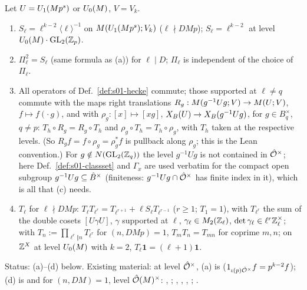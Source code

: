 \begin{proposition}[relations]\label{prop:s01-relations}
Let $U=U_1(Mp^s)$ or $U_0(M)$, $V=V_k$.
\begin{enumerate}[label=(\alph*)]
\item $S_\ell=\ell^{k-2}\langle\ell\rangle^{-1}$ on $M(U_1(Mp^s);V_k)$ ($\ell\nmid DMp$); $S_\ell=\ell^{k-2}$ at level
  $U_0(M)\cdot\mathrm{GL}_2(\mathbb{Z}_p)$.
\item $\Pi_\ell^2=S_\ell$ (same formula as (a)) for $\ell\mid D$; $\Pi_\ell$ is independent of the choice of $\Pi_\ell$.
\item All operators of Def.~\ref{def:s01-hecke} commute; those supported at $\ell\ne q$ commute with the maps
  right translations $R_g:M(g^{-1}Ug;V)\to M(U;V)$, $f\mapsto f(\cdot\,g)$, and with $\rho_g:[x]\mapsto[xg]$,
  $X_B(U)\to X_B(g^{-1}Ug)$, for $g\in B_q^\times$, $q\ne p$: $T_h\circ R_g=R_g\circ T_h$ and $\rho_g\circ T_h=T_h\circ\rho_g$, with $T_h$
  taken at the respective levels. (So $R_gf=f\circ\rho_g=\rho_g^*f$ is pullback along $\rho_g$; this is the Lean convention.) For $g\notin N(\mathrm{GL}_2(\mathbb{Z}_q))$ the level
  $g^{-1}Ug$ is not contained in $\hat{\mathcal{O}}^\times$; here Def.~\ref{def:s01-classset} and $\Gamma_x$ are used verbatim for the compact open subgroup $g^{-1}Ug\subseteq\hat{B}^\times$
  (finiteness: $g^{-1}Ug\cap\hat{\mathcal{O}}^\times$ has finite index in it), which is all that (c) needs.
\item $T_\ell$ for $\ell\nmid DMp$: $T_\ell T_{\ell^r}=T_{\ell^{r+1}}+\ell S_\ell T_{\ell^{r-1}}$ ($r\ge1$; $T_1=1$), with $T_{\ell^r}$ the sum of
  the double cosets $[U\gamma U]$, $\gamma$ supported at $\ell$, $\gamma_\ell\in M_2(\mathbb{Z}_\ell)$, $\det\gamma_\ell\in\ell^r\mathbb{Z}_\ell^\times$; with
  $T_n:=\prod_{\ell^r\Vert n}T_{\ell^r}$ for $(n,DMp)=1$, $T_mT_n=T_{mn}$ for coprime $m,n$; on $\mathbb{Z}^X$ at level $U_0(M)$ with $k=2$,
  $T_\ell\mathbf 1=(\ell+1)\mathbf 1$.
\end{enumerate}
Status: (a)--(d) \stproved{} below. Existing material: at level $\hat{\mathcal{O}}^\times$, (a) is \stformal{} 
 ($1_{\iota(p)\hat{\mathcal{O}}^\times}f=p^{k-2}f$); (d) is \stknown{}
 and
\stformal{} for $(n,DM)=1$, level $\hat{\mathcal{O}}(M)^\times$:  ,
;  , ,
, ;  .

\end{proposition}
